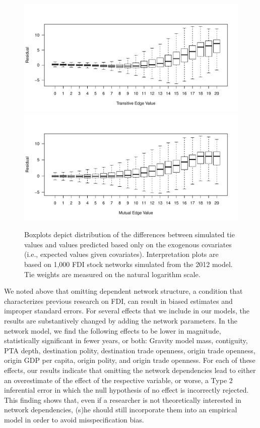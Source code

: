 \documentclass{article}
\begin{document}
\begin{figure}[htp]
\centering
\includegraphics[scale=.75]{draft_figures/transitiveBoxplot.pdf} \vspace{-.5cm}\\
\includegraphics[scale=.75]{draft_figures/mutualBoxplot.pdf} \vspace{-.5cm}
\caption{\label{fig:interpret} Boxplots depict distribution of the differences between simulated tie values and values predicted based only on the exogenous covariates (i.e., expected values given covariates). Interpretation plots are based on 1,000 FDI stock networks simulated from the 2012 model. Tie weights are measured on the natural logarithm scale. }
\end{figure}



We noted above that omitting dependent network structure, a condition that characterizes previous research on FDI, can result in biased estimates and improper standard errors. For several effects that we include in our models, the results are substantively changed by adding the network parameters. In the network model, we find the following effects to be lower in magnitude, statistically significant in fewer years, or both: Gravity model mass, contiguity, PTA depth, destination polity, destination trade openness, origin trade openness, origin GDP per capita, origin polity, and origin trade openness. For each of these effects, our results indicate that omitting the network dependencies lead to either an overestimate of the effect of the respective variable, or worse, a Type 2 inferential error in which the null hypothesis of no effect is incorrectly rejected. This finding shows that, even if a researcher is not theoretically interested in network dependencies, (s)he should still incorporate them into an empirical model in order to avoid misspecification bias.
\end{document}
